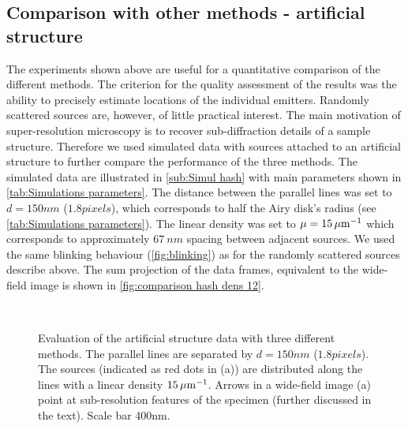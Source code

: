 \subsection{Comparison with other methods - artificial structure\label{sub:results - comparison - structure}}
The experiments shown above are useful for a quantitative comparison of the different methods. The criterion for the quality assessment of the results was the ability to precisely estimate locations of the individual emitters.  Randomly scattered sources are, however, of little practical interest. The main motivation of super-resolution microscopy is to recover sub-diffraction details of a sample structure. Therefore we used simulated data with sources attached to an artificial structure to further compare the performance of the three methods. The simulated data are illustrated in \autoref{sub:Simul hash} with main parameters shown in \autoref{tab:Simulations parameters}. The distance between the parallel lines was set to $d=150\unit{nm}$ ($1.8 \unit{pixels}$), which corresponds to half the Airy disk's radius (see \autoref{tab:Simulations parameters}). The linear density was set to $\mu = 15\, \mathrm{\mu m}^{-1}$ which corresponds to approximately $67\ \unit{nm}$ spacing between adjacent sources. We used the same blinking behaviour (\autoref{fig:blinking}\ddd) as for the randomly scattered sources describe above. The sum projection of the data frames, equivalent to the wide-field image is shown in \autoref{fig:comparison hash dens 12}\aaa.
%
\begin{figure}[!h]
	\centering
	\newcommand{\sizef}{.95}
	\newcommand{\wf}{.45\textwidth}
	\\
	\caption{Evaluation of the artificial structure data with three different methods. The parallel lines are separated by $d=150 \unit{nm}$ ($1.8 \unit{pixels}$). The sources (indicated as red dots in (a)) are distributed along the lines with a linear density $15 \, \mathrm{\mu m}^{-1}$. Arrows in a wide-field image (a) point at sub-resolution features of the specimen (further discussed in the text). Scale bar 400\unit{nm}.}
	\label{fig:comparison hash dens 12}
\end{figure}
%

